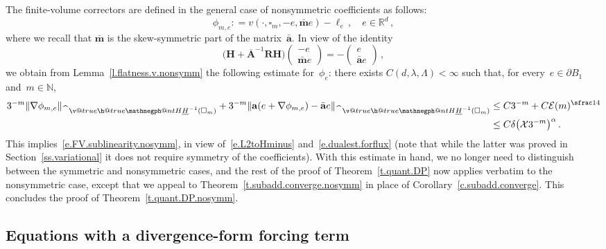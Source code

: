 \documentclass[11pt]{article} %
\makeatletter
\let\oldsquare\square %
\renewcommand{\square}{\oldsquare}
\numberwithin{equation}{section}
\theoremstyle{definition}
\let\originalleft\left
\let\originalright\right
\renewcommand{\left}{\mathopen{}\mathclose\bgroup\originalleft}
\renewcommand{\right}{\aftergroup\egroup\originalright}
\newcommand*{\N}{\ensuremath{\mathbb{N}}}
\newcommand*{\Rd}{\ensuremath{\mathbb{R}^d}}
\renewcommand*{\hat}{\widehat}
\renewcommand{\a}{\mathbf{a}}
\newcommand{\ahom}{\bar{\a}}
\newcommand{\mhom}{\bar{\mathbf{m}}}
\newcommand{\cu}{\square}
\newcommand{\X}{\mathcal{X}}
\newcommand{\negphantom}{\v@true\h@true\negph@nt}
\newcommand{\negph@nt}{\ifmmode\expandafter\mathpalette 
  \expandafter\mathnegph@nt\else\expandafter\makenegph@nt\fi}
\newcommand{\makenegph@nt}[1]{%
  \setbox\z@\hbox{\color@begingroup#1\color@endgroup}\finnegph@nt}
\newcommand{\finnegph@nt}{%
  \setbox\tw@\null 
  \ifv@ \ht\tw@\ht\z@\dp\tw@\dp\z@\fi \ifh@\wd\tw@-\wd\z@\fi\box\tw@}
\newcommand{\mathnegph@nt}[2]{%
  \setbox\z@\hbox{$\m@th #1{#2}$}\finnegph@nt}
\newcommand{\Hminusul}{\hat{\phantom{H}}\negphantom{H}\underline{H}^{-1}}
\newcommand{\bfA}{\mathbf{A}}
\newcommand{\rota}{\mathbf{R}}
\newcommand{\refl}{\mathbf{H}}
\makeatother
\begin{document}
The finite-volume correctors are defined in the general case of nonsymmetric coefficients as follows:
\begin{equation}
\label{e.FVCtomu}
\phi_{m,e}: = v(\cdot,\cu_m,-e,\mhom e) - \ell_e
\,, \quad e\in \Rd\,,
\end{equation}
where we recall that $\mhom$ is the skew-symmetric part of the matrix~$\ahom$.
In view of the identity 
\begin{equation*}
\bigl( \refl  + \overline{\bfA}^{-1} \rota \refl  \bigr) \begin{pmatrix}
-e \\  \mhom e
\end{pmatrix}
=
- \begin{pmatrix}
e
\\
\ahom e
\end{pmatrix}
\,,
\end{equation*}
we obtain from Lemma~\ref{l.flatness.v.nonsymm} the following estimate for~$\phi_e$: there exists $C(d,\lambda,\Lambda)<\infty$ such that, for every~$e\in \partial B_1$ and~$m\in\N$,
\begin{align}
\label{e.FVC}
3^{-m}\left\| \nabla \phi_{m,e} \right\|_{\Hminusul(\cu_m)}
+
3^{-m}\left\| \a\left(e+ \nabla \phi_{m,e} \right)- \ahom e \right\|_{\Hminusul(\cu_m)}
&
\leq
C3^{-m}
+
C\mathcal{E} (m)^{\sfrac14}
\notag \\ & 
\leq 
C \delta \bigl( \X 3^{-m} \bigr)^{\alpha}
\,.
\end{align}
This implies~\eqref{e.FV.sublinearity.nosymm}, in view of~\eqref{e.L2toHminus} and~\eqref{e.dualest.forflux} (note that while the latter was proved in Section~\ref{ss.variational} it does not require symmetry of the coefficients). 
With this estimate in hand, we no longer need to distinguish between the symmetric and nonsymmetric cases, and the rest of the proof of Theorem~\ref{t.quant.DP} now applies verbatim to the nonsymmetric case, except that we appeal to Theorem~\ref{t.subadd.converge.nosymm} in place of Corollary~\ref{c.subadd.converge}.
This concludes the proof of Theorem~\ref{t.quant.DP.nosymm}.










\subsection{Equations with a divergence-form forcing term}
\label{ss.rhs} 
\end{document}
